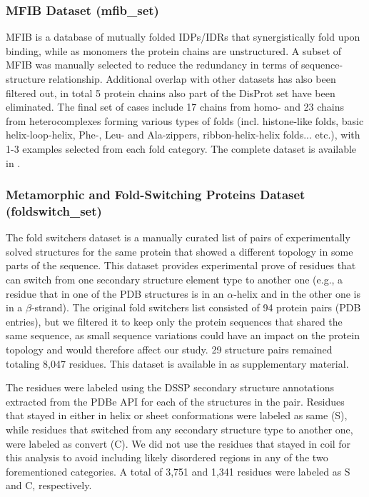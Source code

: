 \subsubsection[MFIB Dataset]{MFIB Dataset (mfib_set)}

MFIB \cite{ficho_mfib_2017} is a database of mutually folded IDPs/IDRs that synergistically fold upon binding, while as monomers the protein chains are unstructured. A subset of MFIB was manually selected to reduce the redundancy in terms of sequence-structure relationship. Additional overlap with other datasets has also been filtered out, in total 5 protein chains also part of the DisProt set have been eliminated. The final set of cases include 17 chains from homo- and 23 chains from heterocomplexes forming various types of folds (incl. histone-like folds, basic helix-loop-helix, Phe-, Leu- and Ala-zippers, ribbon-helix-helix folds... etc.), with 1-3 examples selected from each fold category. The complete dataset is available in .


\subsubsection[Metamorphic and Fold-Switching Proteins Dataset]{Metamorphic and Fold-Switching Proteins Dataset\\(foldswitch_set)}

The fold switchers dataset is a manually curated list of pairs of experimentally solved structures for the same protein that showed a different topology in some parts of the sequence. This dataset provides experimental prove of residues that can switch from one secondary structure element type to another one (e.g., a residue that in one of the PDB structures is in an $\alpha$-helix and in the other one is in a $\beta$-strand). The original fold switchers list consisted of 94 protein pairs (PDB entries), but we filtered it to keep only the protein sequences that shared the same sequence, as small sequence variations could have an impact on the protein topology and would therefore affect our study. 29 structure pairs remained totaling 8,047 residues. This dataset is available in  as supplementary material.

The residues were labeled using the DSSP secondary structure annotations \cite{kabsch_dictionary_1983} extracted from the PDBe API \cite{mir_pdbe_2018} for each of the structures in the pair. Residues that stayed in either in helix or sheet conformations were labeled as same (S), while residues that switched from any secondary structure type to another one, were labeled as convert (C). We did not use the residues that stayed in coil for this analysis to avoid including likely disordered regions in any of the two forementioned categories. A total of 3,751 and 1,341 residues were labeled as S and C, respectively.


